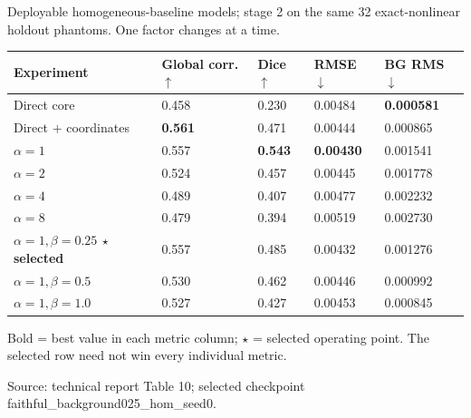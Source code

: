 \documentclass[border=6pt]{standalone}
\begin{document}
\begin{minipage}{18.3cm}

  \vspace{0.25em}
  {\small\color{srlNavy}Deployable homogeneous-baseline models; stage 2 on
  the same 32 exact-nonlinear holdout phantoms. One factor changes at a time.}

  \vspace{0.45em}
  \renewcommand{\arraystretch}{1.25}
  \setlength{\tabcolsep}{6.5pt}
  \begin{tabular}{@{}L{6.3cm}C{2.55cm}C{2.15cm}C{2.45cm}C{2.55cm}@{}}
    \toprule
    \textbf{Experiment} &
    \textbf{Global corr. $\uparrow$} &
    \textbf{Dice $\uparrow$} &
    \textbf{RMSE $\downarrow$} &
    \textbf{BG RMS $\downarrow$} \\
    \midrule
    Direct core & 0.458 & 0.230 & 0.00484 & \textbf{0.000581} \\
    Direct $+$ coordinates & \textbf{0.561} & 0.471 & 0.00444 & 0.000865 \\
    \midrule
    $\alpha=1$ & 0.557 & \textbf{0.543} & \textbf{0.00430} & 0.001541 \\
    $\alpha=2$ & 0.524 & 0.457 & 0.00445 & 0.001778 \\
    $\alpha=4$ & 0.489 & 0.407 & 0.00477 & 0.002232 \\
    $\alpha=8$ & 0.479 & 0.394 & 0.00519 & 0.002730 \\
    \midrule
    \textbf{$\alpha=1,\beta=0.25$ \enspace$\star$ selected} &
      0.557 & 0.485 & 0.00432 & 0.001276 \\
    $\alpha=1,\beta=0.5$ & 0.530 & 0.462 & 0.00446 & 0.000992 \\
    $\alpha=1,\beta=1.0$ & 0.527 & 0.427 & 0.00453 & 0.000845 \\
    \bottomrule
  \end{tabular}


  \vspace{0.05em}
  {\footnotesize\color{baselineGray}Bold = best value in each metric column;
  $\star$ = selected operating point. The selected row need not win every
  individual metric.}

  \vspace{0.25em}
  {\scriptsize\color{baselineGray}Source: technical report Table 10; selected
  checkpoint faithful\_background025\_hom\_seed0.}
\end{minipage}
\end{document}
